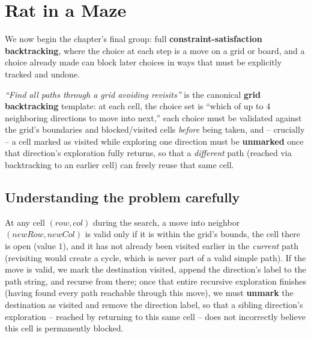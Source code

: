 \section{Rat in a Maze}
\label{sec:rec-rat-in-maze}

\noindent We now begin the chapter's final group: full
\textbf{constraint-satisfaction backtracking}, where the choice at each
step is a move on a grid or board, and a choice already made can block
later choices in ways that must be explicitly tracked and undone.


\begin{patternbox}
\emph{``Find all paths through a grid avoiding revisits''} is the
canonical \textbf{grid backtracking} template: at each cell, the choice
set is ``which of up to $4$ neighboring directions to move into next,''
each choice must be validated against the grid's boundaries and
blocked/visited cells \emph{before} being taken, and -- crucially -- a
cell marked as visited while exploring one direction must be
\textbf{unmarked} once that direction's exploration fully returns, so
that a \emph{different} path (reached via backtracking to an earlier
cell) can freely reuse that same cell.
\end{patternbox}

\subsection*{Understanding the problem carefully}

At any cell $(\textit{row},\textit{col})$ during the search, a move into
neighbor $(\textit{newRow},\textit{newCol})$ is valid only if it is
within the grid's bounds, the cell there is open (value $1$), and it has
not already been visited earlier in the \emph{current} path (revisiting
would create a cycle, which is never part of a valid simple path). If
the move is valid, we mark the destination visited, append the
direction's label to the path string, and recurse from there; once that
entire recursive exploration finishes (having found every path reachable
through this move), we must \textbf{unmark} the destination as visited
and remove the direction label, so that a sibling direction's
exploration -- reached by returning to this same cell -- does not
incorrectly believe this cell is permanently blocked.

